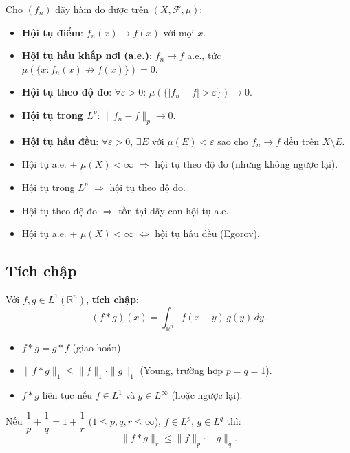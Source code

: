 \documentclass[12pt,a4paper]{article}
\begin{document}
\begin{dinhnghia}
  Cho $(f_n)$ dãy hàm đo được trên $(X, \mathcal{F}, \mu)$:
  \begin{itemize}
    \item \textbf{Hội tụ điểm}: $f_n(x) \to f(x)$ với mọi $x$.
    \item \textbf{Hội tụ hầu khắp nơi (a.e.)}: $f_n \to f$ a.e., tức $\mu(\{x : f_n(x) \not\to f(x)\}) = 0$.
    \item \textbf{Hội tụ theo độ đo}: $\forall \varepsilon > 0$: $\mu(\{|f_n - f| > \varepsilon\}) \to 0$.
    \item \textbf{Hội tụ trong $L^p$}: $\|f_n - f\|_p \to 0$.
    \item \textbf{Hội tụ hầu đều}: $\forall \varepsilon > 0$, $\exists E$ với $\mu(E) < \varepsilon$ sao cho $f_n \to f$ đều trên $X \setminus E$.
  \end{itemize}
\end{dinhnghia}

\begin{dinhly}[title={Quan hệ giữa các loại hội tụ}]
  \begin{itemize}
    \item Hội tụ a.e. + $\mu(X) < \infty$ $\Rightarrow$ hội tụ theo độ đo (nhưng không ngược lại).
    \item Hội tụ trong $L^p$ $\Rightarrow$ hội tụ theo độ đo.
    \item Hội tụ theo độ đo $\Rightarrow$ tồn tại dãy con hội tụ a.e.
    \item Hội tụ a.e. + $\mu(X) < \infty$ $\Leftrightarrow$ hội tụ hầu đều (Egorov).
  \end{itemize}
\end{dinhly}

\subsection{Tích chập}

\begin{dinhnghia}
  Với $f, g \in L^1(\mathbb{R}^n)$, \textbf{tích chập}:
  \[
    (f * g)(x) = \int_{\mathbb{R}^n} f(x - y)\,g(y)\,dy.
  \]
\end{dinhnghia}

\begin{tinhchat}
  \begin{itemize}
    \item $f * g = g * f$ (giao hoán).
    \item $\|f * g\|_1 \le \|f\|_1 \cdot \|g\|_1$ (Young, trường hợp $p = q = 1$).
    \item $f * g$ liên tục nếu $f \in L^1$ và $g \in L^\infty$ (hoặc ngược lại).
  \end{itemize}
\end{tinhchat}

\begin{dinhly}[title={Bất đẳng thức Young (tổng quát)}]
  Nếu $\dfrac{1}{p} + \dfrac{1}{q} = 1 + \dfrac{1}{r}$ ($1 \le p, q, r \le \infty$), $f \in L^p$, $g \in L^q$ thì:
  \[
    \|f * g\|_r \le \|f\|_p \cdot \|g\|_q.
  \]
\end{dinhly}
\end{document}
